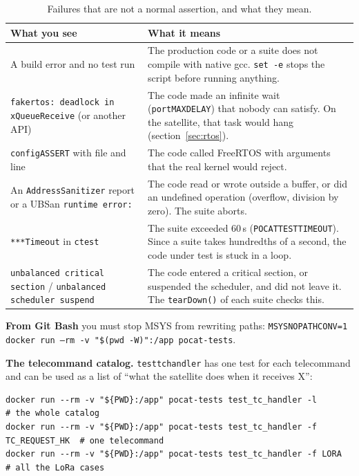 \documentclass[11pt,a4paper]{article}
\DeclareRobustCommand{\_}{\textunderscore\allowbreak}
\newcommand{\cd}[1]{\texttt{#1}}
\begin{document}
\begin{table}[H]
\centering\small
\begin{tabularx}{\textwidth}{@{}>{\raggedright\arraybackslash}p{5.4cm}>{\raggedright\arraybackslash}X@{}}
\toprule
What you see & What it means\\
\midrule
A build error and no test run & The production code or a suite does not compile with native gcc. \cd{set -e} stops the script before running anything.\\
\cd{fake\_rtos: deadlock in xQueueReceive} (or another API) & The code made an infinite wait (\cd{portMAX\_DELAY}) that nobody can satisfy. On the satellite, that task would hang (section~\ref{sec:rtos}).\\
\cd{configASSERT} with file and line & The code called FreeRTOS with arguments that the real kernel would reject.\\
An \cd{AddressSanitizer} report or a UBSan \cd{runtime error:} & The code read or wrote outside a buffer, or did an undefined operation (overflow, division by zero). The suite aborts.\\
\cd{***Timeout} in \cd{ctest} & The suite exceeded 60\,s (\cd{POCAT\_TEST\_TIMEOUT}). Since a suite takes hundredths of a second, the code under test is stuck in a loop.\\
\cd{unbalanced critical section} / \cd{unbalanced scheduler suspend} & The code entered a critical section, or suspended the scheduler, and did not leave it. The \cd{tearDown()} of each suite checks this.\\
\bottomrule
\end{tabularx}
\caption{Failures that are not a normal assertion, and what they mean.}
\label{tab:testerrors}
\end{table}

\textbf{From Git Bash} you must stop MSYS from rewriting paths:
\cd{MSYS\_NO\_PATHCONV=1 docker run --rm -v "\$(pwd -W)":/app pocat-tests}.

\textbf{The telecommand catalog.} \cd{test\_tc\_handler} has one test for each telecommand
and can be used as a list of ``what the satellite does when it receives X'':
\begin{lstlisting}
docker run --rm -v "${PWD}:/app" pocat-tests test_tc_handler -l                # the whole catalog
docker run --rm -v "${PWD}:/app" pocat-tests test_tc_handler -f TC_REQUEST_HK  # one telecommand
docker run --rm -v "${PWD}:/app" pocat-tests test_tc_handler -f LORA           # all the LoRa cases
\end{lstlisting}
\end{document}
